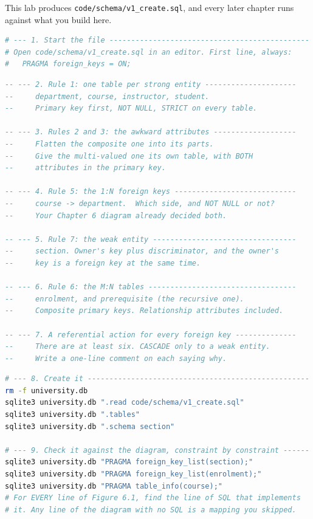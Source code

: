\begin{lab}
This lab produces \texttt{code/schema/v1\_create.sql}, and every later chapter
runs against what you build here.

\begin{lstlisting}[language=bash]
# --- 1. Start the file ----------------------------------------------
# Open code/schema/v1_create.sql in an editor. First line, always:
#   PRAGMA foreign_keys = ON;
\end{lstlisting}
\begin{lstlisting}[language=sql]
-- --- 2. Rule 1: one table per strong entity ---------------------
--     department, course, instructor, student.
--     Primary key first, NOT NULL, STRICT on every table.

-- --- 3. Rules 2 and 3: the awkward attributes -------------------
--     Flatten the composite one into its parts.
--     Give the multi-valued one its own table, with BOTH
--     attributes in the primary key.

-- --- 4. Rule 5: the 1:N foreign keys ----------------------------
--     course -> department.  Which side, and NOT NULL or not?
--     Your Chapter 6 diagram already decided both.

-- --- 5. Rule 7: the weak entity ---------------------------------
--     section. Owner's key plus discriminator, and the owner's
--     key is a foreign key at the same time.

-- --- 6. Rule 6: the M:N tables ----------------------------------
--     enrolment, and prerequisite (the recursive one).
--     Composite primary keys. Relationship attributes included.

-- --- 7. A referential action for every foreign key --------------
--     There are at least six. CASCADE only to a weak entity.
--     Write a one-line comment on each saying why.
\end{lstlisting}
\begin{lstlisting}[language=bash]
# --- 8. Create it ---------------------------------------------------
rm -f university.db
sqlite3 university.db ".read code/schema/v1_create.sql"
sqlite3 university.db ".tables"
sqlite3 university.db ".schema section"

# --- 9. Check it against the diagram, constraint by constraint ------
sqlite3 university.db "PRAGMA foreign_key_list(section);"
sqlite3 university.db "PRAGMA foreign_key_list(enrolment);"
sqlite3 university.db "PRAGMA table_info(course);"
# For EVERY line of Figure 6.1, find the line of SQL that implements
# it. Any line of the diagram with no SQL is a mapping you skipped.


\end{lstlisting}
\end{lab}
